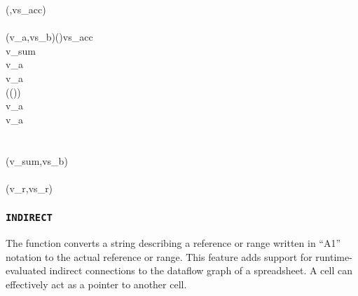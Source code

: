 \begin{hscode}
\>[10]{}\<[13]%
\>[13]{}\;(,vs_{acc})\;\mathrel{=}{}\<[E]%
\\
\>[13]{}\<[16]%
\>[16]{}\<[E]%
\\
\>[16]{}\<[19]%
\>[19]{}(v_a,vs_b)\mathrel{=}(\;)\;\;vs_{acc}\;\<[E]%
\\
\>[16]{}\<[19]%
\>[19]{}v_{sum}\mathrel{=}{}\<[E]%
\\
\>[19]{}\<[22]%
\>[22]{}\;v_a\;\<[E]%
\\
\>[22]{}\<[25]%
\>[25]{}\;\anonymous {}\<[37]%
\>[37]{}\to v_a{}\<[E]%
\\
\>[22]{}\<[25]%
\>[25]{}\;\<[37]%
\>[37]{}\to {}\;(\;(\;))\;\;\<[E]%
\\
\>[22]{}\<[25]%
\>[25]{}\;\<[37]%
\>[37]{}\to {}\;\;\;v_a{}\<[E]%
\\
\>[22]{}\<[25]%
\>[25]{}\;\<[37]%
\>[37]{}\to {}\;\;\;v_a{}\<[E]%
\\
\>[22]{}\<[25]%
\>[25]{}\anonymous {}\<[37]%
\>[37]{}\to {}\;\<[E]%
\\
\>[13]{}\<[16]%
\>[16]{}\<[E]%
\\
\>[16]{}\<[19]%
\>[19]{}(v_{sum},vs_b){}\<[E]%
\\
\>[B]{}\<[4]%
\>[4]{}\<[E]%
\\
\>[4]{}\<[7]%
\>[7]{}(v_r,vs_r){}\<[E]%
\ColumnHook
\end{hscode}\resethooks

\subsubsection{\texttt{INDIRECT}}

The  function converts a string describing a reference or range
written in ``A1'' notation to the actual reference or range. This feature adds
support for runtime-evaluated indirect connections to the dataflow graph of a
spreadsheet. A cell can effectively act as a pointer to another cell.

